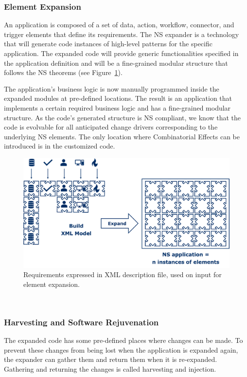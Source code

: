 \subsubsection{Element Expansion}\label{Element Expansion} An application is composed of a
set of data, action, workflow, connector, and trigger elements that define its
requirements. The NS expander is a technology that will generate code instances of
high-level patterns for the specific application. The expanded code will provide generic
functionalities specified in the application definition and will be a fine-grained modular
structure that follows the NS theorems (see Figure~\ref{fig_1}).

The application's business logic is now manually programmed inside the expanded modules at
pre-defined locations. The result is an application that implements a certain required
business logic and has a fine-grained modular structure. As the code's generated structure
is NS compliant, we know that the code is evolvable for all anticipated change drivers
corresponding to the underlying NS elements. The only location where Combinatorial Effects
can be introduced is in the customized code.
\begin{figure}[htbp]
\centering
\centerline{\includegraphics[scale=0.7]{figures/Picture1.png}}
\caption{Requirements expressed in XML description file, used on input for element expansion.}
\label{fig_1}
\end{figure}
\\
%
%
\subsubsection{Harvesting and Software Rejuvenation}\label{Harvesting and Software
Rejuvenation} The expanded code has some pre-defined places where changes can be made. To
prevent these changes from being lost when the application is expanded again, the expander
can gather them and return them when it is re-expanded. Gathering and returning the
changes is called harvesting and injection.

